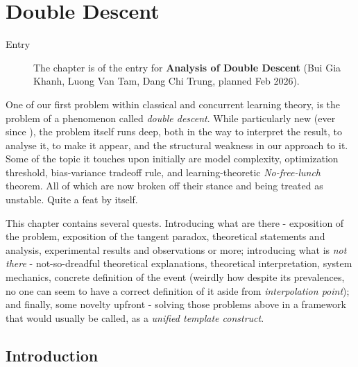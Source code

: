 \chapter{Double Descent}\label{chapter:double_descent_prob}

\begin{description}
  \item[Entry] The chapter is of the entry for \textbf{Analysis of Double Descent} (Bui Gia Khanh, Luong Van Tam, Dang Chi Trung, planned Feb 2026).  
\end{description}

One of our first problem within classical and concurrent learning theory, is the problem of a phenomenon called \textit{double descent}. While particularly new (ever since \cite{belkin_reconciling_2019}), the problem itself runs deep, both in the way to interpret the result, to analyse it, to make it appear, and the structural weakness in our approach to it. Some of the topic it touches upon initially are model complexity, optimization threshold, bias-variance tradeoff rule, and learning-theoretic \textit{No-free-lunch} theorem. All of which are now broken off their stance and being treated as unstable. Quite a feat by itself. 

This chapter contains several quests. Introducing what are there - exposition of the problem, exposition of the tangent paradox, theoretical statements and analysis, experimental results and observations or more; introducing what is \textit{not there} - not-so-dreadful theoretical explanations, theoretical interpretation, system mechanics, concrete definition of the event (weirdly how despite its prevalences, no one can seem to have a correct definition of it aside from \textit{interpolation point}); and finally, some novelty upfront - solving those problems above in a framework that would usually be called, as a \textit{unified template construct}.
\localtableofcontents

\section{Introduction}

